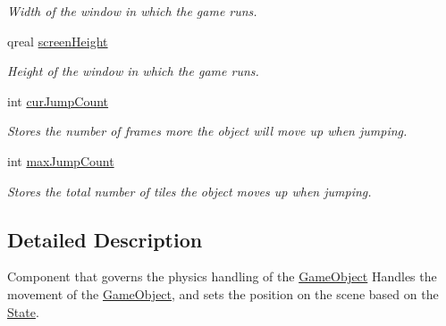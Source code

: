 \begin{DoxyCompactItemize}
\begin{DoxyCompactList}\small\item\em Width of the window in which the game runs. \end{DoxyCompactList}\item 
\hypertarget{classPhysicsComponent_a1541f4f1eb4a7e231683f2769ed397f3}{qreal \hyperlink{classPhysicsComponent_a1541f4f1eb4a7e231683f2769ed397f3}{screen\-Height}}\label{classPhysicsComponent_a1541f4f1eb4a7e231683f2769ed397f3}

\begin{DoxyCompactList}\small\item\em Height of the window in which the game runs. \end{DoxyCompactList}\item 
\hypertarget{classPhysicsComponent_ae88a255f60e8d4bcaab4b431d6744562}{int \hyperlink{classPhysicsComponent_ae88a255f60e8d4bcaab4b431d6744562}{cur\-Jump\-Count}}\label{classPhysicsComponent_ae88a255f60e8d4bcaab4b431d6744562}

\begin{DoxyCompactList}\small\item\em Stores the number of frames more the object will move up when jumping. \end{DoxyCompactList}\item 
\hypertarget{classPhysicsComponent_af619d6984f110bb81bdfe5889d1ef431}{int \hyperlink{classPhysicsComponent_af619d6984f110bb81bdfe5889d1ef431}{max\-Jump\-Count}}\label{classPhysicsComponent_af619d6984f110bb81bdfe5889d1ef431}

\begin{DoxyCompactList}\small\item\em Stores the total number of tiles the object moves up when jumping. \end{DoxyCompactList}\end{DoxyCompactItemize}


\subsection{Detailed Description}
Component that governs the physics handling of the \hyperlink{classGameObject}{Game\-Object} Handles the movement of the \hyperlink{classGameObject}{Game\-Object}, and sets the position on the scene based on the \hyperlink{classState}{State}. 

